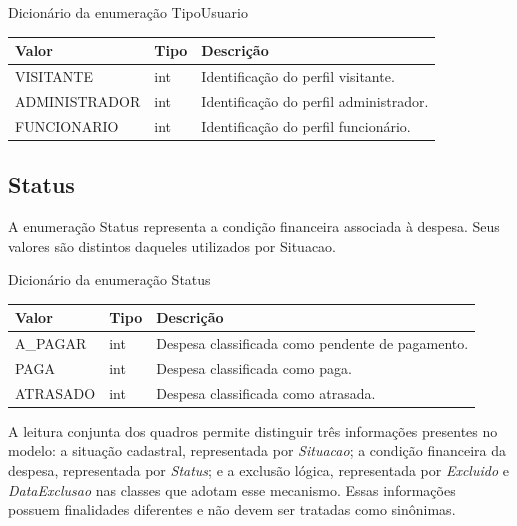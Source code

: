 \begingroup
\small
\setlength{\tabcolsep}{4pt}
\setlength{\LTcapwidth}{\textwidth}
\setlength{\larguracolunascivitas}{\dimexpr\textwidth-6\tabcolsep-4\arrayrulewidth\relax}
\begin{quadro}[H]
\centering
\caption{Dicionário da enumeração TipoUsuario}\label{qua:cap3-15}
\begin{tabular}{|P{0.31\larguracolunascivitas}|P{0.15\larguracolunascivitas}|P{0.54\larguracolunascivitas}|}
\hline
\textbf{Valor} & \textbf{Tipo} & \textbf{Descrição} \\ \hline
VISITANTE & int & Identificação do perfil visitante. \\ \hline
ADMINISTRADOR & int & Identificação do perfil administrador. \\ \hline
FUNCIONARIO & int & Identificação do perfil funcionário. \\ \hline
\end{tabular}
\end{quadro}
\endgroup

\subsection{Status}
A enumeração Status representa a condição financeira associada à despesa. Seus valores são distintos daqueles utilizados por Situacao.

\begingroup
\small
\setlength{\tabcolsep}{4pt}
\setlength{\LTcapwidth}{\textwidth}
\setlength{\larguracolunascivitas}{\dimexpr\textwidth-6\tabcolsep-4\arrayrulewidth\relax}
\begin{quadro}[H]
\centering
\caption{Dicionário da enumeração Status}\label{qua:cap3-16}
\begin{tabular}{|P{0.31\larguracolunascivitas}|P{0.15\larguracolunascivitas}|P{0.54\larguracolunascivitas}|}
\hline
\textbf{Valor} & \textbf{Tipo} & \textbf{Descrição} \\ \hline
A\_PAGAR & int & Despesa classificada como pendente de pagamento. \\ \hline
PAGA & int & Despesa classificada como paga. \\ \hline
ATRASADO & int & Despesa classificada como atrasada. \\ \hline
\end{tabular}
\end{quadro}
\endgroup

A leitura conjunta dos quadros permite distinguir três informações presentes no modelo: a situação cadastral, representada por \textit{Situacao}; a condição financeira da despesa, representada por \textit{Status}; e a exclusão lógica, representada por \textit{Excluido} e \textit{DataExclusao} nas classes que adotam esse mecanismo. Essas informações possuem finalidades diferentes e não devem ser tratadas como sinônimas.

